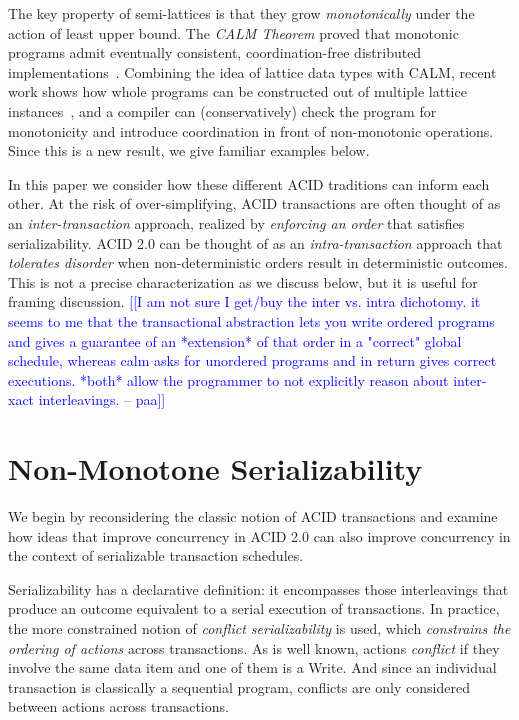 \documentclass{sig-alternate}
\newcommand{\paa}[1]{{\textcolor{blue}{[[#1 -- paa]]}}}
\begin{document}
The key property of semi-lattices is that they grow \emph{monotonically} under
the action of least upper bound.  The \emph{CALM Theorem} proved that monotonic
programs admit eventually consistent, coordination-free distributed
implementations~\cite{Alvaro2011,Ameloot2011,Hellerstein2010}.  Combining the
idea of lattice data types with CALM, recent work shows how whole programs can
be constructed out of multiple lattice instances~\cite{Conway2012}, and a
compiler can (conservatively) check the program for monotonicity and introduce
coordination in front of non-monotonic operations.  Since this is a new result,
we give familiar examples below.

In this paper we consider how these different ACID traditions can inform each
other.  At the risk of over-simplifying, ACID transactions are often thought of
as an \emph{inter-transaction} approach, realized by \emph{enforcing an order}
that satisfies serializability.  ACID 2.0 can be thought of as an
\emph{intra-transaction} approach that \emph{tolerates disorder} when
non-deterministic orders result in deterministic outcomes.  This is not a
precise characterization as we discuss below, but it is useful for framing
discussion.  \paa{I am not sure I get/buy the inter vs. intra dichotomy.  it
  seems to me that the transactional abstraction lets you write ordered programs
  and gives a guarantee of an *extension* of that order in a "correct" global
  schedule, whereas calm asks for unordered programs and in return gives correct
  executions.  *both* allow the programmer to not explicitly reason about
  inter-xact interleavings.}

\section{Non-Monotone Serializability}
We begin by reconsidering the classic notion of ACID transactions and examine
how ideas that improve concurrency in ACID 2.0 can also improve concurrency in
the context of serializable transaction schedules.

Serializability has a declarative definition: it encompasses those interleavings
that produce an outcome equivalent to a serial execution of transactions.  In
practice, the more constrained notion of \emph{conflict serializability} is
used, which \emph{constrains the ordering of actions} across transactions.  As
is well known, actions \emph{conflict} if they involve the same data item and
one of them is a Write.  And since an individual transaction is classically a
sequential program, conflicts are only considered between actions across
transactions.
\end{document}
